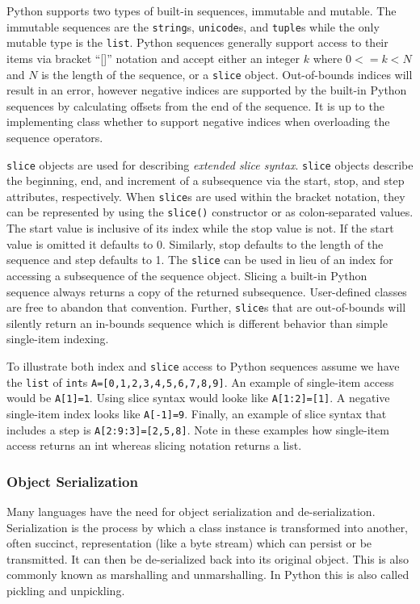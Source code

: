 \documentclass{sigplanconf}
\begin{document}
Python supports two types of built-in sequences, immutable and mutable. The
immutable sequences are the \texttt{string}s, \texttt{unicode}s, and
\texttt{tuple}s while the only mutable type is the \texttt{list}. Python
sequences generally support access to their items via bracket “[]” notation
and accept either an integer $k$ where $0 <= k < N$ and $N$ is the length of
the sequence, or a \texttt{slice} object. Out-of-bounds indices will result in
an error, however negative indices are supported by the built-in Python
sequences by calculating offsets from the end of the sequence.  It is up to
the implementing class whether to support negative indices when overloading
the sequence operators.

\texttt{slice} objects are used for describing \emph{extended slice syntax}.
\texttt{slice} objects describe the beginning, end, and increment of a
subsequence via the start, stop, and step attributes, respectively. When
\texttt{slice}s are used within the bracket notation, they can be represented
by using the \texttt{slice()} constructor or as colon-separated values. The
start value is inclusive of its index while the stop value is not. If the
start value is omitted it defaults to 0. Similarly, stop defaults to the
length of the sequence and step defaults to 1. The \texttt{slice} can be used
in lieu of an index for accessing a subsequence of the sequence object.
Slicing a built-in Python sequence always returns a copy of the returned
subsequence. User-defined classes are free to abandon that convention.
Further, \texttt{slice}s that are out-of-bounds will silently return an
in-bounds sequence which is different behavior than simple single-item
indexing.

To illustrate both index and \texttt{slice} access to Python sequences assume
we have the \texttt{list} of \texttt{int}s \texttt{A=[0,1,2,3,4,5,6,7,8,9]}.
An example of single-item access would be \texttt{A[1]=1}. Using slice syntax
would looke like \texttt{A[1:2]=[1]}. A negative single-item index looks like
\texttt{A[-1]=9}.  Finally, an example of slice syntax that includes a step is
\texttt{A[2:9:3]=[2,5,8]}.  Note in these examples how single-item access
returns an int whereas slicing notation returns a list.

\subsubsection{Object Serialization}

Many languages have the need for object serialization and de-serialization.
Serialization is the process by which a class instance is transformed into
another, often succinct, representation (like a byte stream) which can
persist or be transmitted. It can then be de-serialized back into its original
object. This is also commonly known as marshalling and unmarshalling. In
Python this is also called pickling and unpickling.
\end{document}
